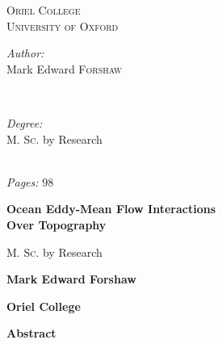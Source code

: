\documentclass[12pt,a4paper]{report}
\begin{document}
\begin{titlepage}
	\textsc{\large Oriel College}\\[0.5cm] %
	\textsc{\LARGE University of Oxford}\\[1.5cm] %
	
	
	
	\begin{minipage}{0.45\textwidth}
		\begin{flushleft} \large
			\emph{Author:}\\
			Mark Edward  \textsc{Forshaw} %
		\end{flushleft}
	\end{minipage}
	~
	\begin{minipage}{0.45\textwidth}
		\begin{flushright} \large
			\emph{Degree:} \\
			 \textsc{M. Sc.} by Research 
		\end{flushright}
	\end{minipage}\\[4cm]
	
	\emph{Pages:} $98$
	
	
	
	
	
	\vfill %
	
\end{titlepage}


\thispagestyle{plain}
\begin{center}
	\singlespacing    
	\Large
	\textbf{Ocean Eddy-Mean Flow
		Interactions \\ Over Topography}
	
	\vspace{0.4cm}
	\large
	\textsc{M. Sc.} by Research
	
	\vspace{0.4cm}
	\textbf{Mark Edward Forshaw}
	
	\vspace{0.4cm}
	\textbf{Oriel College}
	
	\vspace{0.9cm}
	\textbf{Abstract}
\end{center}
\end{document}
